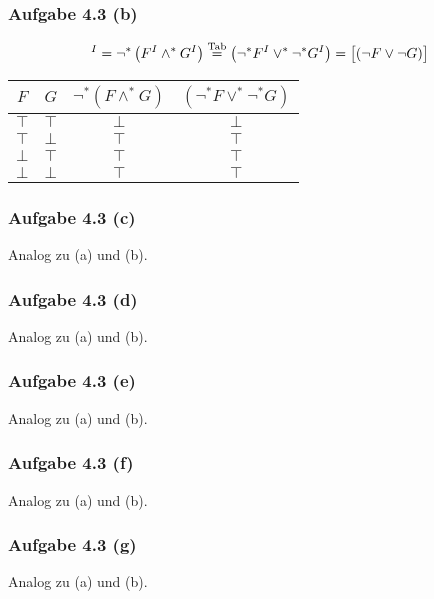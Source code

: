 \subsubsection{Aufgabe 4.3 (b)}
\begin{align*}
	[\neg(F\wedge G)]^I=\neg^\ast\left(F^I\wedge^\ast G^I\right)\stackeq{\text{Tab}}
	\left(\neg^\ast F^I\vee^\ast\neg^\ast G^I\right)=\big[(\neg F\vee\neg G)\big]
\end{align*}

\begin{tabular}{c|c||c|c}
	$F$ & $G$ & $\neg^\ast(F\wedge^\ast G)$ & $(\neg^\ast F\vee^\ast\neg^\ast G)$\\ \hline
	$\top$ & $\top$ & $\bot$ & $\bot$\\
	$\top$ & $\bot$ & $\top$ & $\top$\\
	$\bot$ & $\top$ & $\top$ & $\top$\\
	$\bot$ & $\bot$ & $\top$ & $\top$
\end{tabular}

\subsubsection{Aufgabe 4.3 (c)}
Analog zu (a) und (b).

\subsubsection{Aufgabe 4.3 (d)}
Analog zu (a) und (b).

\subsubsection{Aufgabe 4.3 (e)}
Analog zu (a) und (b).

\subsubsection{Aufgabe 4.3 (f)}
Analog zu (a) und (b).

\subsubsection{Aufgabe 4.3 (g)}
Analog zu (a) und (b).

